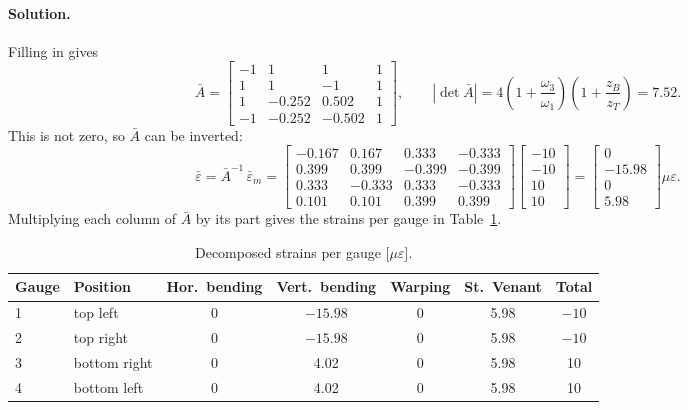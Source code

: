\paragraph{Solution.} Filling in gives
\begin{equation}
  \bar A =
  \begin{bmatrix}
    -1 & 1 & 1 & 1\\
    1 & 1 & -1 & 1\\
    1 & -0.252 & 0.502 & 1\\
    -1 & -0.252 & -0.502 & 1
  \end{bmatrix} ,
  \qquad
  |\det\bar A| = 4\left(1+\frac{\omega_3}{\omega_1}\right)\left(1+\frac{z_B}{z_T}\right) = 7.52 .
\end{equation}
This is not zero, so $\bar A$ can be inverted:
\begin{equation}
  \bar\varepsilon = \bar A^{-1}\,\bar\varepsilon_m =
  \begin{bmatrix}
    -0.167 & 0.167 & 0.333 & -0.333\\
    0.399 & 0.399 & -0.399 & -0.399\\
    0.333 & -0.333 & 0.333 & -0.333\\
    0.101 & 0.101 & 0.399 & 0.399
  \end{bmatrix}
  \begin{bmatrix} -10\\ -10\\ 10\\ 10 \end{bmatrix}
  =
  \begin{bmatrix} 0\\ -15.98\\ 0\\ 5.98 \end{bmatrix}\mu\varepsilon .
\end{equation}
Multiplying each column of $\bar A$ by its part gives the strains per gauge in Table~\ref{tab:b-decomp}.

\begin{table}[H]
  \centering
  \caption{Decomposed strains per gauge [$\mu\varepsilon$].}
  \label{tab:b-decomp}
  \begin{tabular}{llccccc}
    \toprule
    Gauge & Position & Hor.\ bending & Vert.\ bending & Warping & St.\ Venant & Total \\
    \midrule
    1 & top left     & 0 & $-15.98$ & 0 & 5.98 & $-10$ \\
    2 & top right    & 0 & $-15.98$ & 0 & 5.98 & $-10$ \\
    3 & bottom right & 0 & 4.02     & 0 & 5.98 & 10 \\
    4 & bottom left  & 0 & 4.02     & 0 & 5.98 & 10 \\
    \bottomrule
  \end{tabular}
\end{table}

